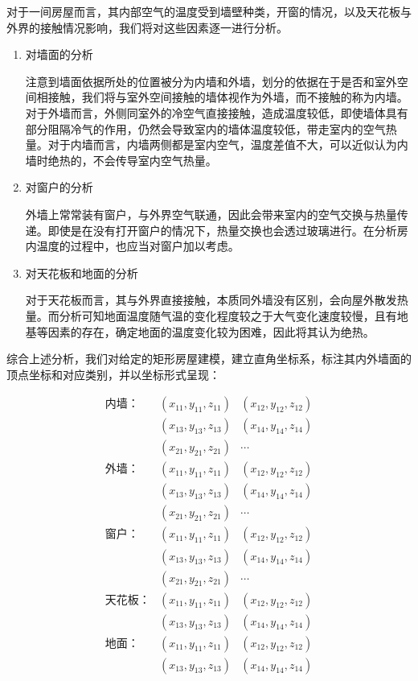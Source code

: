 \documentclass{my_paper}
\begin{document}
对于一间房屋而言，其内部空气的温度受到墙壁种类，开窗的情况，以及天花板与外界的接触情况影响，我们将对这些因素逐一进行分析。
\begin{enumerate}
    \item 对墙面的分析
    
    注意到墙面依据所处的位置被分为内墙和外墙\cite{3}，划分的依据在于是否和室外空间相接触，我们将与室外空间接触的墙体视作为外墙，而不接触的称为内墙。对于外墙而言，外侧同室外的冷空气直接接触，造成温度较低，即使墙体具有部分阻隔冷气的作用，仍然会导致室内的墙体温度较低，带走室内的空气热量。对于内墙而言，内墙两侧都是室内空气，温度差值不大，可以近似认为内墙时绝热的，不会传导室内空气热量。
    \item 对窗户的分析
    
    外墙上常常装有窗户，与外界空气联通，因此会带来室内的空气交换与热量传递。即使是在没有打开窗户的情况下，热量交换也会透过玻璃进行。在分析房内温度的过程中，也应当对窗户加以考虑。
    \item 对天花板和地面的分析
    
    对于天花板而言，其与外界直接接触，本质同外墙没有区别，会向屋外散发热量。而分析可知地面温度随气温的变化程度较之于大气变化速度较慢，且有地基等因素的存在，确定地面的温度变化较为困难，因此将其认为绝热。
    

\end{enumerate}

综合上述分析，我们对给定的矩形房屋建模，建立直角坐标系，标注其内外墙面的顶点坐标和对应类别，并以坐标形式呈现：

\begin{equation}
    \begin{aligned}
        \text{内墙：}&(x_{11},y_{11},z_{11})&(x_{12},y_{12},z_{12})\\
                    &(x_{13},y_{13},z_{13})&(x_{14},y_{14},z_{14})\\
                    &(x_{21},y_{21},z_{21})&\cdots \\
        \text{外墙：}&(x_{11},y_{11},z_{11})&(x_{12},y_{12},z_{12})\\
        &(x_{13},y_{13},z_{13})&(x_{14},y_{14},z_{14})\\
        &(x_{21},y_{21},z_{21})&\cdots \\
        \text{窗户：}&(x_{11},y_{11},z_{11})&(x_{12},y_{12},z_{12})\\
        &(x_{13},y_{13},z_{13})&(x_{14},y_{14},z_{14})\\
        &(x_{21},y_{21},z_{21})&\cdots \\
        \text{天花板：}&(x_{11},y_{11},z_{11})&(x_{12},y_{12},z_{12})\\
        &(x_{13},y_{13},z_{13})&(x_{14},y_{14},z_{14})\\
        \text{地面：}&(x_{11},y_{11},z_{11})&(x_{12},y_{12},z_{12})\\
        &(x_{13},y_{13},z_{13})&(x_{14},y_{14},z_{14})\\
    \end{aligned}
\end{equation}
\end{document}
